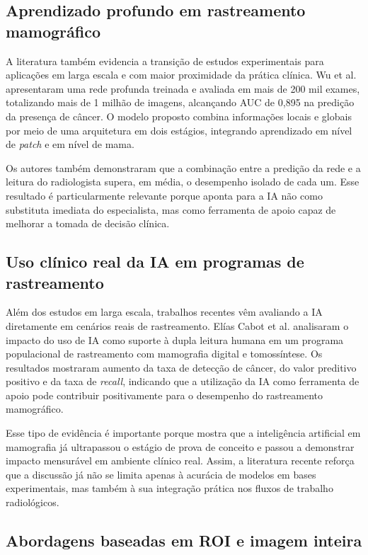 \documentclass[
    12pt,
    openright,
    oneside,
    a4paper,
    english,
    brazil
]{abntex2}
\begin{document}
\subsection{Aprendizado profundo em rastreamento mamográfico}

A literatura também evidencia a transição de estudos experimentais para aplicações em larga escala e com maior proximidade da prática clínica. Wu et al. \cite{wu2020} apresentaram uma rede profunda treinada e avaliada em mais de 200 mil exames, totalizando mais de 1 milhão de imagens, alcançando AUC de 0{,}895 na predição da presença de câncer. O modelo proposto combina informações locais e globais por meio de uma arquitetura em dois estágios, integrando aprendizado em nível de \textit{patch} e em nível de mama.

Os autores também demonstraram que a combinação entre a predição da rede e a leitura do radiologista supera, em média, o desempenho isolado de cada um. Esse resultado é particularmente relevante porque aponta para a IA não como substituta imediata do especialista, mas como ferramenta de apoio capaz de melhorar a tomada de decisão clínica.

\subsection{Uso clínico real da IA em programas de rastreamento}

Além dos estudos em larga escala, trabalhos recentes vêm avaliando a IA diretamente em cenários reais de rastreamento. Elías Cabot et al. \cite{eliascabot2024} analisaram o impacto do uso de IA como suporte à dupla leitura humana em um programa populacional de rastreamento com mamografia digital e tomossíntese. Os resultados mostraram aumento da taxa de detecção de câncer, do valor preditivo positivo e da taxa de \textit{recall}, indicando que a utilização da IA como ferramenta de apoio pode contribuir positivamente para o desempenho do rastreamento mamográfico.

Esse tipo de evidência é importante porque mostra que a inteligência artificial em mamografia já ultrapassou o estágio de prova de conceito e passou a demonstrar impacto mensurável em ambiente clínico real. Assim, a literatura recente reforça que a discussão já não se limita apenas à acurácia de modelos em bases experimentais, mas também à sua integração prática nos fluxos de trabalho radiológicos.

\subsection{Abordagens baseadas em ROI e imagem inteira}
\end{document}
